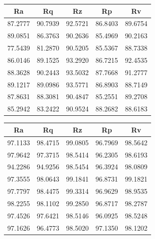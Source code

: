 \documentclass[suppldata]{interact}
\begin{document}
\begin{landscape}
\begin{minipage}{0.35\textwidth}
\begin{tabular}{|c|c|c|c|c|c|}
    \end{tabular}
        \label{tab:gdmsete}
    \end{minipage}
   \hfill 
   \begin{minipage}{0.30\textwidth}
   \small
\centering
    \centering
     \begin{tabular}{|c|c|c|c|c|}
    \hline
        Ra &  Rq &  Rz &  Rp & Rv \\ \hline
         87.2777 & 90.7939 & 92.5721 & 86.8403 & 89.6754 \\ \hline
        89.0851 & 86.3763 & 90.2636 & 85.4969 & 90.2163 \\ \hline
        77.5439 & 81.2870 & 90.5205 & 85.5367 & 88.7338 \\ \hline
        86.0146 & 89.1525 & 93.2920 & 86.7215 & 92.4535 \\ \hline
        88.3628 & 90.2443 & 93.5032 & 87.7668 & 91.2777 \\ \hline
        89.1217 & 89.0986 & 93.5771 & 86.8903 & 88.7149 \\ \hline
        87.8631 & 88.3081 & 90.4847 & 85.2551 & 89.2708 \\ \hline
        85.2942 & 83.2422 & 90.9524 & 88.2682 & 88.6183 \\ \hline

    \end{tabular}
        \label{tab:gdmapete}
    \end{minipage}
    \hfill 
    \begin{minipage}{0.40\textwidth}
    \small
 \centering
    \begin{tabular}{|c|c|c|c|c|}
    \hline
        Ra &  Rq &  Rz &  Rp & Rv \\ \hline
        97.1133 & 98.4715 & 99.0805 & 96.7969 & 98.5642 \\ \hline
        97.9642 & 97.3715 & 98.5414 & 96.2305 & 98.6193 \\ \hline
        94.2286 & 94.9256 & 98.5454 & 96.3924 & 98.0809 \\ \hline
        97.3555 & 98.0643 & 99.1841 & 96.8731 & 99.1821 \\ \hline
        97.7797 & 98.4475 & 99.3314 & 96.9629 & 98.9535 \\ \hline
        98.2255 & 98.1102 & 99.2850 & 96.8717 & 98.2787 \\ \hline
        97.4526 & 97.6421 & 98.5146 & 96.0925 & 98.5248 \\ \hline
        97.1626 & 96.4773 & 98.5020 & 97.1350 & 98.1202 \\ \hline
   \end{tabular}
     \label{tab:gdr2te}
     \end{minipage}
      \end{landscape}
\end{document}
